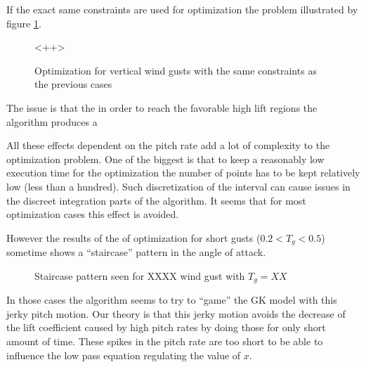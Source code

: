 \par If the exact same constraints are used for optimization the problem illustrated by figure \ref{fig:unlimited_alpha_dot}.	

\begin{figure}[h]
  \begin{center}
  
<++>%
\end{center}
  \caption{Optimization for vertical wind gusts with the same constraints as the previous cases}
  \label{fig:unlimited_alpha_dot}
\end{figure}

The issue is that the in order to reach the favorable high lift regions the algorithm produces a 

All these effects dependent on the pitch rate add a lot of complexity to the optimization problem.
One of the biggest is that to keep a reasonably low execution time for the optimization the number of points has to be kept relatively low (less than a hundred).
Such discretization of the interval can cause issues in the discreet integration parts of the algorithm.
It seems that for most optimization cases this effect is avoided.

\par However the results of the of optimization for short gusts ($0.2<T_g<0.5$) sometime shows a ``staircase'' pattern in the angle of attack.

\begin{figure}[h]
  \centering
  \caption{Staircase pattern seen for XXXX wind gust with $T_g=XX$}
  \label{fig:staircase_case}
\end{figure}

\par In those cases the algorithm seems to try to ``game'' the GK model with this jerky pitch motion.
Our theory is that this jerky motion avoids the decrease of the lift coefficient caused by high pitch rates by doing those for only short amount of time.
These spikes in the pitch rate are too short to be able to influence the low pass equation regulating the value of $x$.






